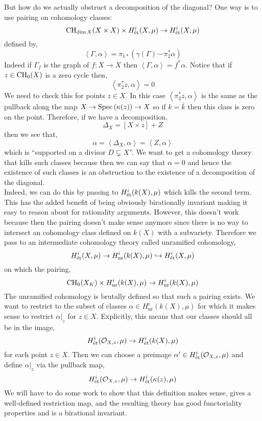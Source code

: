 \documentclass[12pt]{article}
\begin{document}
\newcommand{\inner}[2]{\left< #1, #2 \right>}
\newcommand{\nr}{\mathrm{nr}}

But how do we actually obstruct a decomposition of the diagonal? One way is to use pairing on \etale cohomology classes:
\[ \mathrm{CH}_{\dim{X}}(X \times X) \times H_{\text{\'{e}t}}^i(X, \mu) \to H_{\text{\'{e}t}}^i(X, \mu) \]
defined by,
\[ \inner{\Gamma}{\alpha} = \pi_{1*}(\gamma(\Gamma) \smile \pi_2^* \alpha) \]
Indeed if $\Gamma_f$ is the graph of $f : X \to X$ then $\inner{\Gamma}{\alpha} = f^* \alpha$.
Notice that if $z \in \mathrm{CH}_0(X)$ is a zero cycle then,
\[ \inner{\pi_2^* z}{\alpha} = 0 \]
We need to check this for points $z \in X$. In this case $\inner{\pi_2^* z}{\alpha}$ is the same as the pullback along the map $X \to \mathrm{Spec}\left( \kappa(z) \right) \to X$ so if $k = \bar{k}$ then this class is zero on the point. Therefore, if we have a decomposition,
\[ \Delta_X = [X \times z] + Z \]
then we see that,
\[ \alpha = \inner{\Delta_X}{\alpha} = \inner{Z}{\alpha} \]
which is ``supported on a divisor $D \subsetneq X$''. We want to get a cohomology theory that kills such classes because then we can say that $\alpha = 0$ and hence the existence of such classes is an obstruction to the existence of a decomposition of the diagonal.
\bigskip\\
Indeed, we can do this by passing to $H^i_{\text{\'{e}t}}(k(X), \mu)$ which kills the second term. This has the added benefit of being obviously birationally invariant making it easy to reason about for rationality arguments. However, this doesn't work because then the pairing doesn't make sense anymore since there is no way to intersect an \etale cohomology class defined on $k(X)$ with a subvariety. Therefore we pass to an intermediate cohomology theory called unramified cohomology,
\[ H^i_{\et}(X, \mu) \to H^i_{\nr}(k(X), \mu) \embed H^i_{\et}(X, \mu) \]
on which the pairing,
\[ \CH_0(X_K) \times H^i_{\nr}(k(X), \mu) \to H^i_{\nr}(k(X), \mu) \]
The unramified cohomology is brutally defined so that such a pairing exists. We want to restrict to the subset of classes $\alpha \in H^i_{\nr}(k(X), \mu)$ for which it makes sense to restrict $\alpha|_z$ for $z \in X$. Explicitly, this means that our classes should all be in the image,
\[ H^i_{\text{\'{e}t}}(\mathcal{O}_{X, z}, \mu) \to H^i_{\text{\'{e}t}}(k(X), \mu) \]
for each point $z \in X$. Then we can choose a preimage $\alpha' \in H^i_{\text{\'{e}t}}(\mathcal{O}_{X, z}, \mu)$ and define $\alpha|_z$ via the pullback map,
\[ H^i_{\text{\'{e}t}}(\mathcal{O}_{X, z}, \mu) \to H^i_{\text{\'{e}t}}(\kappa(z), \mu) \]
We will have to do some work to show that this definition makes sense, gives a well-defined restriction map, and the resulting theory has good functoriality properties and is a birational invariant. 
\end{document}
